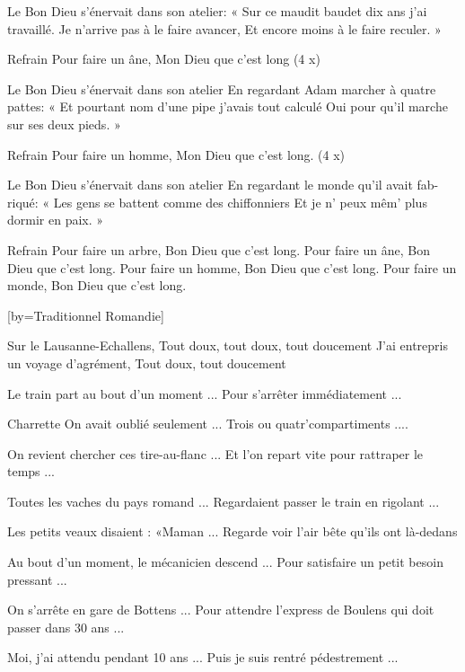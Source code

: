 \beginverse
Le Bon Dieu s'énervait dans son atelier:
« Sur ce maudit baudet dix ans j'ai travaillé.
Je n'arrive pas à le faire avancer, 
Et encore moins à le faire reculer. »
\endverse

	Refrain
Pour faire un âne, Mon Dieu que c'est long (4 x)

\beginverse
Le Bon Dieu s'énervait dans son atelier
En regardant Adam marcher à quatre pattes:
« Et pourtant nom d'une pipe j'avais tout calculé
Oui pour qu'il marche sur ses deux pieds. »
\endverse

	Refrain
Pour faire un homme, Mon Dieu que c'est long. (4 x)

\beginverse
Le Bon Dieu s'énervait dans son atelier
En regardant le monde qu'il avait fab-riqué:
« Les gens se battent comme des chiffonniers
Et je n' peux mêm' plus dormir en paix. »
\endverse

	Refrain
Pour faire un arbre, Bon Dieu que c'est long.
Pour faire un âne, Bon Dieu que c'est long.
Pour faire un homme, Bon Dieu que c'est long.
Pour faire un monde, Bon Dieu que c'est long.

[by={Traditionnel \- Romandie}]

\beginverse
Sur le Lausanne-Echallens,
Tout doux, tout doux, tout doucement 
J'ai entrepris un voyage d'agrément,
Tout doux, tout doucement
\endverse

\beginverse
Le train part au bout d'un moment ...
Pour s'arrêter immédiatement ...
\endverse

\beginverse
Charrette \! On avait oublié seulement ...
Trois ou quatr'compartiments ....
\endverse

\beginverse
On revient chercher ces tire-au-flanc ...
Et l'on repart vite pour rattraper le temps ...
\endverse

\beginverse
Toutes les vaches du pays romand ...
Regardaient passer le train en rigolant ...
\endverse

\beginverse
Les petits veaux disaient : «Maman ...
Regarde voir l'air bête qu'ils ont là-dedans
\endverse

\beginverse
Au bout d'un moment, le mécanicien descend ...
Pour satisfaire un petit besoin pressant ...
\endverse

\beginverse
On s'arrête en gare de Bottens ...
Pour attendre l'express de Boulens qui doit passer dans 30 ans ...
\endverse

\beginverse
Moi, j'ai attendu pendant 10 ans ...
Puis je suis rentré pédestrement ...
\endverse

